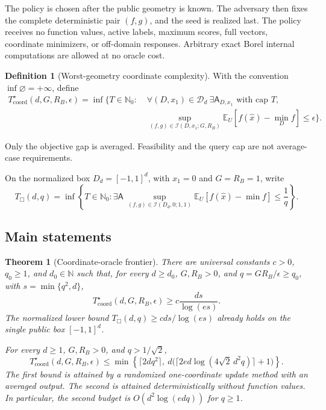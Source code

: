 \documentclass[11pt]{article}
\numberwithin{equation}{section}
\newtheorem{theorem}{Theorem}[section]
\theoremstyle{definition}
\newtheorem{definition}[definition]{Definition}
\theoremstyle{remark}
\newcommand{\N}{\mathbb N}
\newcommand{\E}{\mathbb E}
\newcommand{\cI}{\mathcal I}
\newcommand{\cD}{\mathcal D}
\newcommand{\Tcoord}{T_{\mathrm{coord}}^\star}
\newcommand{\Tbox}{T_{\Box}}
\newcommand{\eps}{\epsilon}
\begin{document}
The policy is chosen after the public geometry is known. The adversary then fixes the complete deterministic pair $(f,g)$, and the seed is realized last. The policy receives no function values, active labels, maximum scores, full vectors, coordinate minimizers, or off-domain responses. Arbitrary exact Borel internal computations are allowed at no oracle cost.

\begin{definition}[Worst-geometry coordinate complexity]\label{def:complexity}
With the convention $\inf\varnothing=+\infty$, define
\begin{equation}\label{eq:minimax}
\begin{split}
\Tcoord(d,G,R_B,\eps)=\inf\bigl\{T\in\N_0:\;&
\forall(D,x_1)\in\cD_d\ \exists\mathsf A_{D,x_1}\text{ with cap }T,\\
&\sup_{(f,g)\in\cI(D,x_1;G,R_B)}
\E_U[f(\widehat x)-\min_Df]\le\eps\bigr\}.
\end{split}
\end{equation}
\end{definition}
Only the objective gap is averaged. Feasibility and the query cap are not average-case requirements.

On the normalized box $D_d=[-1,1]^d$, with $x_1=0$ and $G=R_B=1$, write
\begin{equation}\label{eq:tbox}
\Tbox(d,q)=\inf\left\{T\in\N_0:
\exists\mathsf A\ \sup_{(f,g)\in\cI(D_d,0;1,1)}
\E_U[f(\widehat x)-\min f]\le\frac1q\right\}.
\end{equation}

\subsection{Main statements}

\begin{theorem}[Coordinate-oracle frontier]\label{thm:main}
There are universal constants $c>0$, $q_0\ge1$, and $d_0\in\N$ such that, for every $d\ge d_0$, $G,R_B>0$, and $q=GR_B/\eps\ge q_0$, with $s=\min\{q^2,d\}$,
\begin{equation}\label{eq:main-lower}
\Tcoord(d,G,R_B,\eps)\ge c\frac{ds}{\log(es)}.
\end{equation}
The normalized lower bound $\Tbox(d,q)\ge cds/\log(es)$ already holds on the single public box $[-1,1]^d$.

For every $d\ge1$, $G,R_B>0$, and $q>1/\sqrt2$,
\begin{equation}\label{eq:main-upper}
\Tcoord(d,G,R_B,\eps)\le
\min\left\{\lceil2dq^2\rceil,
\ d\bigl(\lceil2ed\log(4\sqrt2\,d^2q)\rceil+1\bigr)\right\}.
\end{equation}
The first bound is attained by a randomized one-coordinate update method with an averaged output. The second is attained deterministically without function values. In particular, the second budget is $O(d^2\log(edq))$ for $q\ge1$.
\end{theorem}
\end{document}
